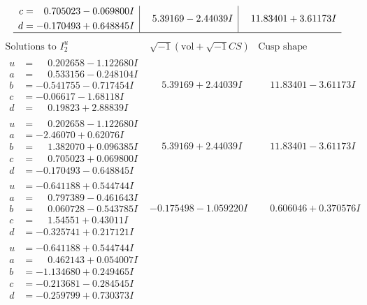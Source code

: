 \documentclass[1p]{elsarticle_modified}
\theoremstyle{definition}
\newcommand{\I}{\sqrt{-1}}
\begin{document}
$$\begin{array}{c|c|c}
\begin{aligned}
c &= \phantom{-}0.705023 - 0.069800 I \\
d &= -0.170493 + 0.648845 I\end{aligned}
 & \phantom{-}5.39169 - 2.44039 I & \phantom{-}11.83401 + 3.61173 I\\
 \hline 
 \end{array}$$\newpage$$\begin{array}{c|c|c}  
\text{Solutions to }I^u_{2}& \I (\text{vol} + \sqrt{-1}CS) & \text{Cusp shape}\\
 \hline 
\begin{aligned}
u &= \phantom{-}0.202658 - 1.122680 I \\
a &= \phantom{-}0.533156 - 0.248104 I \\
b &= -0.541755 - 0.717454 I \\
c &= -0.06617 - 1.68118 I \\
d &= \phantom{-}0.19823 + 2.88839 I\end{aligned}
 & \phantom{-}5.39169 + 2.44039 I & \phantom{-}11.83401 - 3.61173 I \\ \hline\begin{aligned}
u &= \phantom{-}0.202658 - 1.122680 I \\
a &= -2.46070 + 0.62076 I \\
b &= \phantom{-}1.382070 + 0.096385 I \\
c &= \phantom{-}0.705023 + 0.069800 I \\
d &= -0.170493 - 0.648845 I\end{aligned}
 & \phantom{-}5.39169 + 2.44039 I & \phantom{-}11.83401 - 3.61173 I \\ \hline\begin{aligned}
u &= -0.641188 + 0.544744 I \\
a &= \phantom{-}0.797389 - 0.461643 I \\
b &= \phantom{-}0.060728 - 0.543785 I \\
c &= \phantom{-}1.54551 + 0.43011 I \\
d &= -0.325741 + 0.217121 I\end{aligned}
 & -0.175498 - 1.059220 I & \phantom{-}0.606046 + 0.370576 I \\ \hline\begin{aligned}
u &= -0.641188 + 0.544744 I \\
a &= \phantom{-}0.462143 + 0.054007 I \\
b &= -1.134680 + 0.249465 I \\
c &= -0.213681 - 0.284545 I \\
d &= -0.259799 + 0.730373 I\end{aligned}

\end{array}$$
\end{document}
